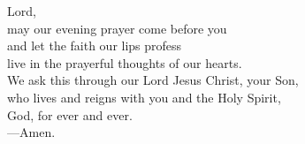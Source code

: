 \prayer


\begin{prayerverse}
Lord,\\
may our evening prayer come before you\\
and let the faith our lips profess\\
live in the prayerful thoughts of our hearts.\\
We ask this through our Lord Jesus Christ, your Son,\\
who lives and reigns with you and the Holy Spirit,\\
God, for ever and ever.\\
{\color{red}---\thinspace}Amen.
\end{prayerverse}

